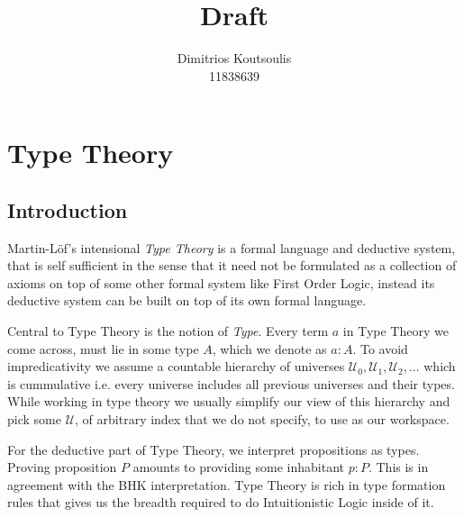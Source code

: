 \documentclass[12pt]{report}
\theoremstyle{definition}
\begin{document}
 
\title{Draft}%
\author{Dimitrios Koutsoulis\\ %
11838639} %
 
\begin{titlepage}
\hypersetup{pageanchor=false}
\maketitle
\thispagestyle{empty}
\end{titlepage}
\hypersetup{pageanchor=true}
\chapter{Type Theory}
\section{Introduction}
Martin-L\"of's intensional \textit{Type Theory} is a formal language and deductive system, that is self sufficient in the sense that it need not be formulated as a collection of axioms on top of some other formal system like First Order Logic, instead its deductive system can be built on top of its own formal language. 

Central to Type Theory is the notion of \textit{Type}. Every term $a$ in Type Theory we come across, must lie in some type $A$, which we denote as $a : A$. 
To avoid impredicativity we assume a countable hierarchy of universes $\mathcal{U}_0,\mathcal{U}_1,\mathcal{U}_2,\ldots$ which is cummulative i.e. every universe includes all previous universes and their types. 
While working in type theory we usually simplify our view of this hierarchy and pick some $\mathcal{U}$, of arbitrary index that we do not specify, to use as our workspace. 

For the deductive part of Type Theory, we interpret propositions as types. 
Proving proposition $P$ amounts to providing some inhabitant $p : P$. 
This is in agreement with the BHK interpretation. 
Type Theory is rich in type formation rules that gives us the breadth required to do Intuitionistic Logic inside of it. 
\end{document}
